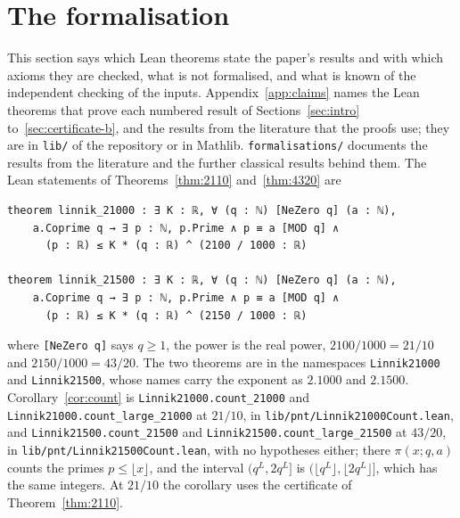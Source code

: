 \documentclass[11pt]{article}
\theoremstyle{definition}
\newcommand{\lean}[1]{\texttt{#1}}
\newcommand{\file}[1]{\nolinkurl{#1}}
\begin{document}
\section{The formalisation}\label{sec:lean}

This section says which Lean theorems state the paper's results and with which axioms they are checked, what is not
formalised, and what is known of the independent checking of the inputs.
Appendix~\ref{app:claims} names the Lean theorems that prove each numbered result of Sections~\ref{sec:intro}
to~\ref{sec:certificate-b}, and the results from the literature that the proofs use; they are in \file{lib/} of the
repository \cite{repo} or in Mathlib. \file{formalisations/} documents the results from the literature and the further
classical results behind them. The Lean statements of Theorems~\ref{thm:2110} and~\ref{thm:4320} are
{\small
\begin{verbatim}
theorem linnik_21000 : ∃ K : ℝ, ∀ (q : ℕ) [NeZero q] (a : ℕ),
    a.Coprime q → ∃ p : ℕ, p.Prime ∧ p ≡ a [MOD q] ∧
      (p : ℝ) ≤ K * (q : ℝ) ^ (2100 / 1000 : ℝ)

theorem linnik_21500 : ∃ K : ℝ, ∀ (q : ℕ) [NeZero q] (a : ℕ),
    a.Coprime q → ∃ p : ℕ, p.Prime ∧ p ≡ a [MOD q] ∧
      (p : ℝ) ≤ K * (q : ℝ) ^ (2150 / 1000 : ℝ)
\end{verbatim}
}
where \lean{[NeZero q]} says $q \ge 1$, the power is the real power, $2100/1000 = 21/10$ and $2150/1000 = 43/20$. The
two theorems are in the namespaces \lean{Linnik21000} and \lean{Linnik21500}, whose names carry the exponent as
$2.1000$ and $2.1500$.
Corollary~\ref{cor:count} is \lean{Linnik21000.\allowbreak count\_21000} and
\lean{Linnik21000.\allowbreak count\_large\_21000} at $21/10$, in \file{lib/pnt/Linnik21000Count.lean}, and
\lean{Linnik21500.\allowbreak count\_21500} and \lean{Linnik21500.\allowbreak count\_large\_21500} at $43/20$, in
\file{lib/pnt/Linnik21500Count.lean}, with no hypotheses either; there $\pi(x; q, a)$ counts the primes $p \le
\lfloor x \rfloor$, and the interval $(q^L, 2q^L]$ is $(\lfloor q^L \rfloor, \lfloor 2q^L \rfloor]$, which has the same
integers. At $21/10$ the corollary uses the certificate of Theorem~\ref{thm:2110}.
\end{document}

